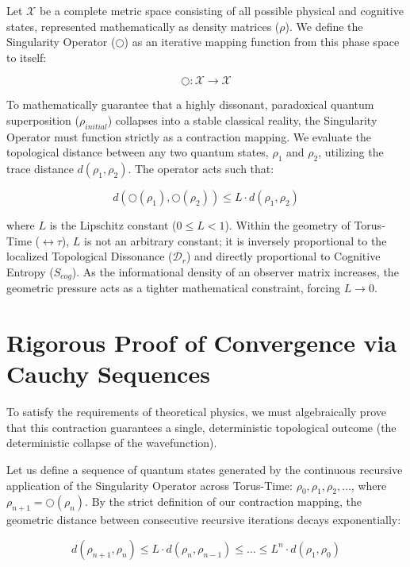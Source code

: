 \documentclass[12pt,openany]{book}
\begin{document}
Let $\mathcal{X}$ be a complete metric space consisting of all possible physical and cognitive states, represented mathematically as density matrices ($\rho$). We define the Singularity Operator ($\bigcirc$) as an iterative mapping function from this phase space to itself:

\begin{equation}
\bigcirc : \mathcal{X} \to \mathcal{X}
\end{equation}

To mathematically guarantee that a highly dissonant, paradoxical quantum superposition ($\rho_{initial}$) collapses into a stable classical reality, the Singularity Operator must function strictly as a contraction mapping. We evaluate the topological distance between any two quantum states, $\rho_1$ and $\rho_2$, utilizing the trace distance $d(\rho_1, \rho_2)$. The operator acts such that:

\begin{equation}
d(\bigcirc(\rho_1), \bigcirc(\rho_2)) \le L \cdot d(\rho_1, \rho_2)
\end{equation}

where $L$ is the Lipschitz constant ($0 \le L < 1$). Within the geometry of Torus-Time ($\leftrightarrow\tau$), $L$ is not an arbitrary constant; it is inversely proportional to the localized Topological Dissonance ($\mathcal{D}_r$) and directly proportional to Cognitive Entropy ($S_{cog}$). As the informational density of an observer matrix increases, the geometric pressure acts as a tighter mathematical constraint, forcing $L \to 0$.

\section{Rigorous Proof of Convergence via Cauchy Sequences}
To satisfy the requirements of theoretical physics, we must algebraically prove that this contraction guarantees a single, deterministic topological outcome (the deterministic collapse of the wavefunction). 

Let us define a sequence of quantum states generated by the continuous recursive application of the Singularity Operator across Torus-Time: $\rho_0, \rho_1, \rho_2, \dots$, where $\rho_{n+1} = \bigcirc(\rho_n)$. By the strict definition of our contraction mapping, the geometric distance between consecutive recursive iterations decays exponentially:

\begin{equation}
d(\rho_{n+1}, \rho_n) \le L \cdot d(\rho_n, \rho_{n-1}) \le \dots \le L^n \cdot d(\rho_1, \rho_0)
\end{equation}
\end{document}
